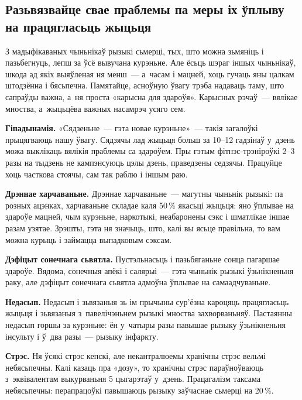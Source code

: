 \subsection*{Разьвязвайце свае праблемы па меры іх ўплыву на працягласьць жыцьця}

З мадыфікаваных чыньнікаў рызыкі сьмерці, тых, што можна зьмяніць і пазьбегнуць, лепш за ўсё вывучана курэньне. Але ёсьць шэраг іншых чыньнікаў, шкода ад якіх выяўленая ня менш~--- а~часам і мацней, хоць гучаць яны цалкам штодзённа і бясьпечна. Памятайце, асноўную ўвагу трэба надаваць таму, што сапраўды важна, а~ня проста «карысна для здароўя». Карысных рэчаў~--- вялікае мноства, а~жыцьцёва важных насамрэч усяго сем. 


\textbf{Гіпадынамія.} «Сядзеньне~--- гэта новае курэньне»~--- такія загалоўкі прыцягваюць нашу ўвагу. Сядзячы лад жыцьця больш за 10--12 гадзінаў у~дзень можа выклікаць вялікія праблемы са здароўем. Пры гэтым фітнэс-трэніроўкі 2--3 разы на тыдзень не кампэнсуюць цэлы дзень, праведзены седзячы. Працуйце хоць часткова стоячы, сам так раблю і іншым раю.

\textbf{Дрэннае харчаваньне.} Дрэннае харчаваньне~--- магутны чыньнік рызыкі: па розных ацэнках, харчаваньне складае каля 50\,\% якасьці жыцьця: яно ўплывае на здароўе мацней, чым курэньне, наркотыкі, неабаронены сэкс і шматлікае іншае разам узятае. Зрэшты, гэта ня значыць, што, калі вы ясьце правільна, то вам можна курыць і займацца выпадковым сэксам.

\textbf{Дэфіцыт сонечнага сьвятла.} Пустэльнасьць і пазьбяганьне сонца пагаршае здароўе. Вядома, сонечныя апёкі і салярыі~--- гэта чыньнік рызыкі ўзьнікненьня раку, але дэфіцыт сонечнага сьвятла адмоўна ўплывае на самаадчуваньне.

\textbf{Недасып.} Недасып і зьвязаныя зь ім прычыны сур'ёзна кароцяць працягласьць жыцьця і зьвязаныя з~павелічэньнем рызыкі мноства захворваньняў. Пастаянны недасып горшы за курэньне: ён у~чатыры разы павышае рызыку ўзьнікненьня інсульту і ў~два разы~--- рызыку інфаркту.

\textbf{Стрэс.} Ня ўсякі стрэс кепскі, але некантралюемы хранічны стрэс вельмі небясьпечны. Калі казаць пра «дозу», то хранічны стрэс параўноўваюць з~эквівалентам выкурваньня 5 цыгарэтаў у~дзень. Працагалізм таксама небясьпечны: перапрацоўкі павышаюць рызыку заўчаснае сьмерці на 20\,\%.

